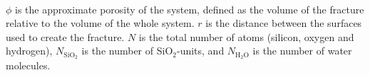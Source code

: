 \begin{table}[htpb]
{        \\%
%
        $\phi$ is the approximate porosity of the system, defined as the volume of the fracture relative to the volume of the whole system. $r$ is the distance between the surfaces used to create the fracture. $N$ is the total number of atoms (silicon, oxygen and hydrogen), $N_\text{SiO$_2$}$ is the number of SiO$_2$-units, and $N_\text{H$_2$O}$ is the number of water molecules. %
%
        \label{tab:systems}%
    }
\end{table}%

\FloatBarrier
